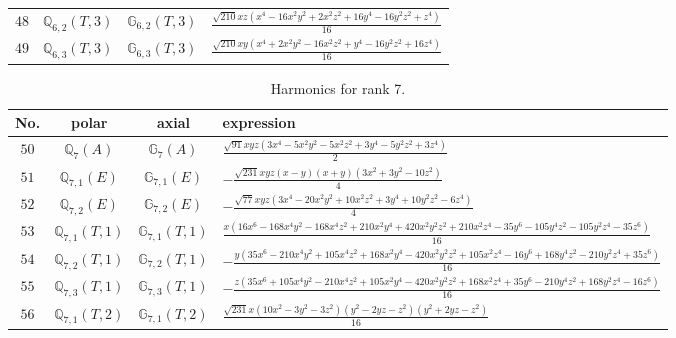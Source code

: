 \documentclass[fleqn,8pt,landscape]{jsarticle}
\begin{document}
\begin{table}[ht!]
\begin{center}
\begin{tabular}{cccl}
$ 48 $ & $ \mathbb{Q}_{6,2}(T,3) $ & $ \mathbb{G}_{6,2}(T,3) $ & $ \frac{\sqrt{210} x z \left(x^{4} - 16 x^{2} y^{2} + 2 x^{2} z^{2} + 16 y^{4} - 16 y^{2} z^{2} + z^{4}\right)}{16} $ \\
$ 49 $ & $ \mathbb{Q}_{6,3}(T,3) $ & $ \mathbb{G}_{6,3}(T,3) $ & $ \frac{\sqrt{210} x y \left(x^{4} + 2 x^{2} y^{2} - 16 x^{2} z^{2} + y^{4} - 16 y^{2} z^{2} + 16 z^{4}\right)}{16} $ \\
 \hline \hline
\end{tabular}
\end{center}
\end{table}
\begin{table}[ht!]
\begin{center}
\caption{Harmonics for rank 7.}
\renewcommand{\arraystretch}{1.3}
\begin{tabular}{cccl} \hline \hline
No. & polar & axial & expression \\ \hline
$ 50 $ & $ \mathbb{Q}_{7}(A) $ & $ \mathbb{G}_{7}(A) $ & $ \frac{\sqrt{91} x y z \left(3 x^{4} - 5 x^{2} y^{2} - 5 x^{2} z^{2} + 3 y^{4} - 5 y^{2} z^{2} + 3 z^{4}\right)}{2} $ \\
$ 51 $ & $ \mathbb{Q}_{7,1}(E) $ & $ \mathbb{G}_{7,1}(E) $ & $ - \frac{\sqrt{231} x y z \left(x - y\right) \left(x + y\right) \left(3 x^{2} + 3 y^{2} - 10 z^{2}\right)}{4} $ \\
$ 52 $ & $ \mathbb{Q}_{7,2}(E) $ & $ \mathbb{G}_{7,2}(E) $ & $ - \frac{\sqrt{77} x y z \left(3 x^{4} - 20 x^{2} y^{2} + 10 x^{2} z^{2} + 3 y^{4} + 10 y^{2} z^{2} - 6 z^{4}\right)}{4} $ \\
$ 53 $ & $ \mathbb{Q}_{7,1}(T,1) $ & $ \mathbb{G}_{7,1}(T,1) $ & $ \frac{x \left(16 x^{6} - 168 x^{4} y^{2} - 168 x^{4} z^{2} + 210 x^{2} y^{4} + 420 x^{2} y^{2} z^{2} + 210 x^{2} z^{4} - 35 y^{6} - 105 y^{4} z^{2} - 105 y^{2} z^{4} - 35 z^{6}\right)}{16} $ \\
$ 54 $ & $ \mathbb{Q}_{7,2}(T,1) $ & $ \mathbb{G}_{7,2}(T,1) $ & $ - \frac{y \left(35 x^{6} - 210 x^{4} y^{2} + 105 x^{4} z^{2} + 168 x^{2} y^{4} - 420 x^{2} y^{2} z^{2} + 105 x^{2} z^{4} - 16 y^{6} + 168 y^{4} z^{2} - 210 y^{2} z^{4} + 35 z^{6}\right)}{16} $ \\
$ 55 $ & $ \mathbb{Q}_{7,3}(T,1) $ & $ \mathbb{G}_{7,3}(T,1) $ & $ - \frac{z \left(35 x^{6} + 105 x^{4} y^{2} - 210 x^{4} z^{2} + 105 x^{2} y^{4} - 420 x^{2} y^{2} z^{2} + 168 x^{2} z^{4} + 35 y^{6} - 210 y^{4} z^{2} + 168 y^{2} z^{4} - 16 z^{6}\right)}{16} $ \\
$ 56 $ & $ \mathbb{Q}_{7,1}(T,2) $ & $ \mathbb{G}_{7,1}(T,2) $ & $ \frac{\sqrt{231} x \left(10 x^{2} - 3 y^{2} - 3 z^{2}\right) \left(y^{2} - 2 y z - z^{2}\right) \left(y^{2} + 2 y z - z^{2}\right)}{16} $ \\

\end{tabular}
\end{center}
\end{table}
\end{document}

